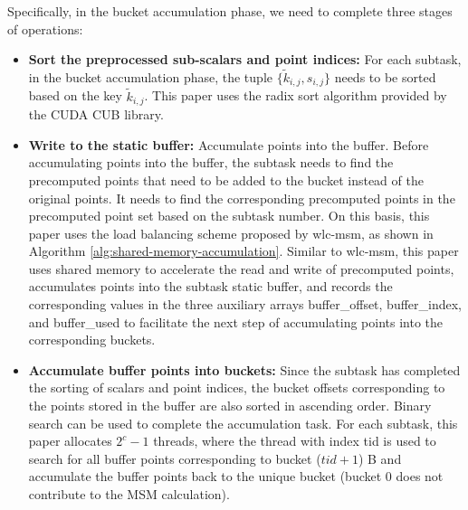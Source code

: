 \documentclass[conference]{IEEEtran}
\begin{document}
Specifically, in the bucket accumulation phase, we need to complete three stages of operations:
\begin{itemize}
    \item \textbf{Sort the preprocessed sub-scalars and point indices:} For each subtask, in the bucket accumulation phase, the tuple $\{\widetilde{k}_{i,j}, s_{i,j}\}$ needs to be sorted based on the key $\widetilde{k}_{i,j}$. This paper uses the radix sort algorithm provided by the CUDA CUB library.
    \item \textbf{Write to the static buffer:} Accumulate points into the buffer. Before accumulating points into the buffer, the subtask needs to find the precomputed points that need to be added to the bucket instead of the original points. It needs to find the corresponding precomputed points in the precomputed point set based on the subtask number. On this basis, this paper uses the load balancing scheme proposed by wlc-msm, as shown in Algorithm \ref{alg:shared-memory-accumulation}. Similar to wlc-msm, this paper uses shared memory to accelerate the read and write of precomputed points, accumulates points into the subtask static buffer, and records the corresponding values in the three auxiliary arrays buffer\_offset, buffer\_index, and buffer\_used to facilitate the next step of accumulating points into the corresponding buckets.
    \item \textbf{Accumulate buffer points into buckets:} Since the subtask has completed the sorting of scalars and point indices, the bucket offsets corresponding to the points stored in the buffer are also sorted in ascending order. Binary search can be used to complete the accumulation task. For each subtask, this paper allocates $2^c-1$ threads, where the thread with index tid is used to search for all buffer points corresponding to bucket ($tid+1$) B and accumulate the buffer points back to the unique bucket (bucket 0 does not contribute to the MSM calculation).
\end{itemize}
\end{document}
